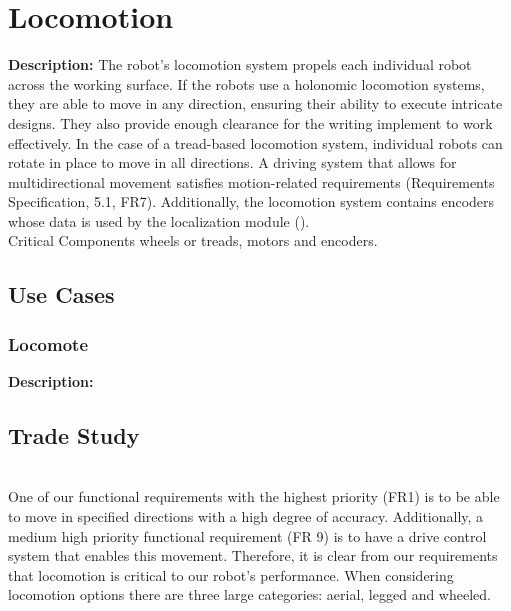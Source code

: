 
\section{Locomotion}
\label{sec:locomotion}
\textbf{Description:} The robot's locomotion system propels each individual robot across the working surface. If the robots use a holonomic locomotion systems, they are able to move in any direction, ensuring their ability to execute intricate designs. They also provide enough clearance for the writing implement to work effectively. In the case of a tread-based locomotion system, individual robots can rotate in place to move in all directions. A driving system that allows for multidirectional movement satisfies motion-related requirements (Requirements Specification, 5.1, FR7). Additionally, the locomotion system contains encoders whose data is used by the localization module (). \\
Critical Components  wheels or treads, motors and encoders.  \\


\subsection{Use Cases}
\subsubsection{Locomote}
\textbf{Description:} 

\subsection{Trade Study}
\label{sec:trade_locomotion}
 \\
One of our functional requirements with the highest priority (FR1) is to be able to move in specified directions with a high degree of accuracy. Additionally, a medium high priority functional requirement (FR 9) is to have a drive control system that enables this movement. Therefore, it is clear from our requirements that locomotion is critical to our robot's performance. When considering locomotion options there are three large categories: aerial, legged and wheeled. 

